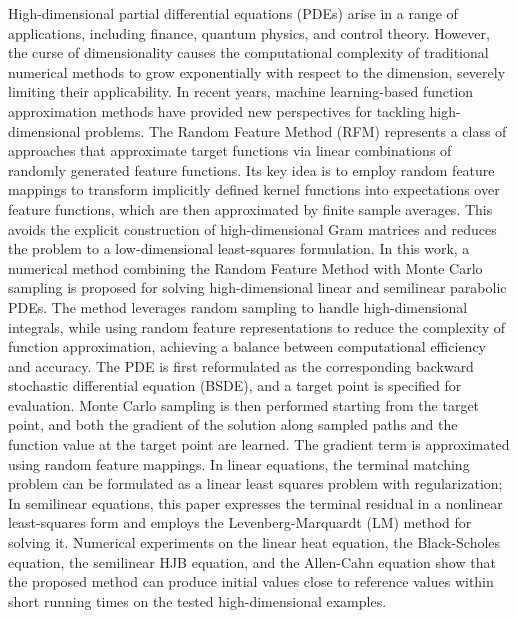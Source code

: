 \begin{abstract*}
  High-dimensional partial differential equations (PDEs) arise in a range of applications,
  including finance, quantum physics, and control theory.
  However, the curse of dimensionality causes the computational complexity of traditional numerical methods
  to grow exponentially with respect to the dimension, severely limiting their applicability.
  In recent years, machine learning-based function approximation methods
  have provided new perspectives for tackling high-dimensional problems.
  The Random Feature Method (RFM) represents a class of approaches
  that approximate target functions via linear combinations of randomly generated feature functions.
  Its key idea is to employ random feature mappings to transform
  implicitly defined kernel functions into expectations over feature functions,
  which are then approximated by finite sample averages.
  This avoids the explicit construction of high-dimensional Gram matrices
  and reduces the problem to a low-dimensional least-squares formulation.
  In this work, a numerical method combining the Random Feature Method with Monte Carlo sampling
  is proposed for solving high-dimensional linear and semilinear parabolic PDEs.
  The method leverages random sampling to handle high-dimensional integrals,
  while using random feature representations to reduce the complexity of function approximation,
  achieving a balance between computational efficiency and accuracy.
  The PDE is first reformulated as the corresponding backward stochastic differential equation (BSDE),
  and a target point is specified for evaluation.
  Monte Carlo sampling is then performed starting from the target point,
  and both the gradient of the solution along sampled paths and the function value at the target point are learned.
  The gradient term is approximated using random feature mappings.
  In linear equations, the terminal matching problem can be formulated
  as a linear least squares problem with regularization;
  In semilinear equations, this paper expresses the terminal residual in a nonlinear least-squares form
  and employs the Levenberg-Marquardt (LM) method for solving it.
  Numerical experiments on the linear heat equation, the Black-Scholes equation,
  the semilinear HJB equation, and the Allen-Cahn equation
  show that the proposed method can produce initial values close to reference values
  within short running times on the tested high-dimensional examples.
\end{abstract*}
